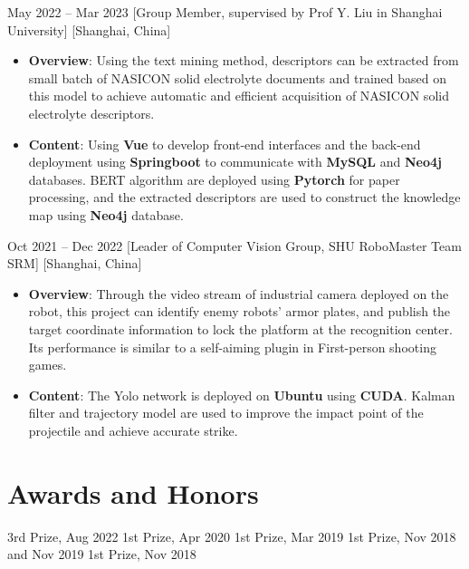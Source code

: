 \documentclass{chicv}
\begin{document}
  {May 2022 -- Mar 2023}
  [Group Member, supervised by Prof Y. Liu in Shanghai University]
  [Shanghai, China]
  \begin{itemize}
    \item \textbf{Overview}: Using the text mining method, descriptors can be extracted from small batch of NASICON solid electrolyte documents and trained based on this model to achieve automatic and efficient acquisition of NASICON solid electrolyte descriptors.
    \item \textbf{Content}: Using \textbf{Vue} to develop front-end interfaces and the back-end deployment using \textbf{Springboot} to communicate with \textbf{MySQL} and \textbf{Neo4j} databases. BERT algorithm are deployed using \textbf{Pytorch} for paper processing, and the extracted descriptors are used to construct the knowledge map using \textbf{Neo4j} database.
  \end{itemize}

  {Oct 2021 -- Dec 2022}
  [Leader of Computer Vision Group, SHU RoboMaster Team SRM]
  [Shanghai, China]
  \begin{itemize}
    \item \textbf{Overview}: Through the video stream of industrial camera deployed on the robot, this project can identify enemy robots' armor plates, and publish the target coordinate information to lock the platform at the recognition center. Its performance is similar to a self-aiming plugin in First-person shooting games.
    \item \textbf{Content}: The Yolo network is deployed on \textbf{Ubuntu} using \textbf{CUDA}. Kalman filter and trajectory model are used to improve the impact point of the projectile and achieve accurate strike.
  \end{itemize}

\section{Awards and Honors}
 {3rd Prize, Aug 2022}
 {1st Prize, Apr 2020}
 {1st Prize, Mar 2019}
 {1st Prize, Nov 2018 and Nov 2019}
 {1st Prize, Nov 2018}
\end{document}
